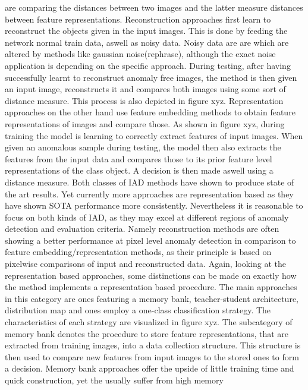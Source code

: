 are comparing the distances between two images and the latter measure distances between feature representations. \newline
Reconstruction approaches first learn to reconstruct the objects given in the input images. This is done by feeding the network normal train data, aswell as noisy data. Noisy data are are 
which are altered by methods like gaussian noise(rephrase), although the exact noise application is depending on the specific approach. During testing, after having successfully learnt to 
reconstruct anomaly free images, the method is then given an input image, reconstructs it and compares both images using some sort of distance measure. This process is also depicted in figure xyz. 
Representation approaches on the other hand use feature embedding methods to obtain feature representations of images and compare those. As shown in figure xyz, during training the model is 
learning to correctly extract features of input images. When given an anomalous sample during testing, the model then also extracts the features from the input data and compares those to its 
prior feature level representations of the class object. A decision is then made aswell using a distance measure.
Both classes of IAD methods have shown to produce state of the art results. Yet currently more approaches are representation based \cite{liu2024deep} as they have shown SOTA performance more 
consistently. Nevertheless it is reasonable to focus on both kinds of IAD, as they may excel at different regions of anomaly detection and evaluation criteria. Namely reconstruction methods are 
often showing a better performance at pixel level anomaly detection in comparison to feature embedding/representation methods, as their principle is based on pixelwise comparisons of input 
and reconstructed data.
\newline
Again, looking at the representation based approaches, some distinctions can be made on exactly how the method implements a representation based procedure.
The main approaches in this category are ones featuring a memory bank, teacher-student architecture, distribution map and ones employ a one-class classification strategy. The characteristics of 
each strategy are visualized in figure xyz. The subcategory of 
memory bank denotes the procedure to store feature representations, that are extracted from training images, into a data collection structure. This structure is then used to compare new 
features from input images to the stored ones to form a decision. Memory bank approaches offer the upside of little training time and quick construction, yet the usually suffer from high memory 
